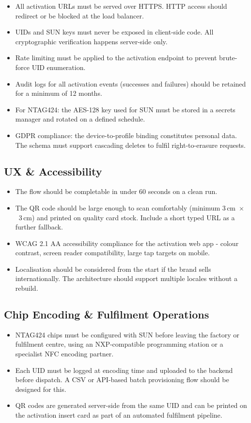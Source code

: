 \documentclass[
	a4paper, %
]{ChaosEngineReport}
\begin{document}
\begin{itemize}
  \item All activation URLs must be served over HTTPS. HTTP access should redirect or be blocked at the load balancer.
  \item UIDs and SUN keys must never be exposed in client-side code. All cryptographic verification happens server-side only.
  \item Rate limiting must be applied to the activation endpoint to prevent brute-force UID enumeration.
  \item Audit logs for all activation events (successes and failures) should be retained for a minimum of 12 months.
  \item For NTAG424: the AES-128 key used for SUN must be stored in a secrets manager and rotated on a defined schedule.
  \item GDPR compliance: the device-to-profile binding constitutes personal data. The schema must support cascading deletes to fulfil right-to-erasure requests.
\end{itemize}

\subsection{UX \& Accessibility}

\begin{itemize}
  \item The flow should be completable in under 60 seconds on a clean run.
  \item The QR code should be large enough to scan comfortably (minimum 3\,cm~$\times$~3\,cm) and printed on quality card stock. Include a short typed URL as a further fallback.
  \item WCAG 2.1 AA accessibility compliance for the activation web app - colour contrast, screen reader compatibility, large tap targets on mobile.
  \item Localisation should be considered from the start if the brand sells internationally. The architecture should support multiple locales without a rebuild.
\end{itemize}

\subsection{Chip Encoding \& Fulfilment Operations}

\begin{itemize}
  \item NTAG424 chips must be configured with SUN before leaving the factory or fulfilment centre, using an NXP-compatible programming station or a specialist NFC encoding partner.
  \item Each UID must be logged at encoding time and uploaded to the backend before dispatch. A CSV or API-based batch provisioning flow should be designed for this.
  \item QR codes are generated server-side from the same UID and can be printed on the activation insert card as part of an automated fulfilment pipeline.
\end{itemize}
\end{document}
